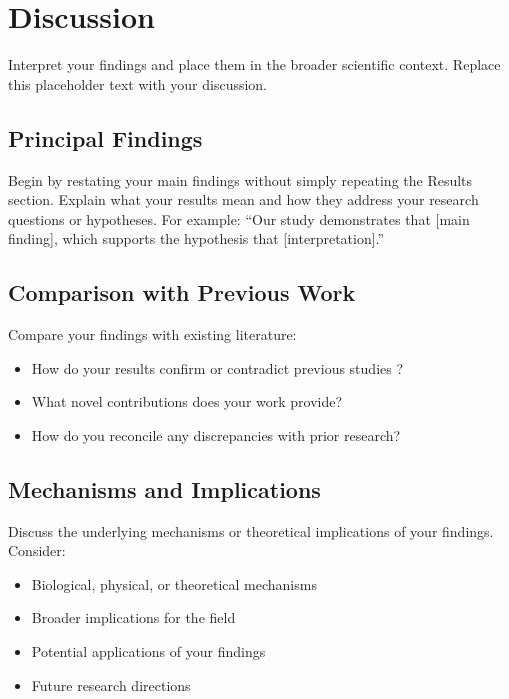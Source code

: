 
\section{Discussion}

Interpret your findings and place them in the broader scientific context. Replace this placeholder text with your discussion.

\subsection{Principal Findings}

Begin by restating your main findings without simply repeating the Results section. Explain what your results mean and how they address your research questions or hypotheses. For example: ``Our study demonstrates that [main finding], which supports the hypothesis that [interpretation].''

\subsection{Comparison with Previous Work}

Compare your findings with existing literature:
\begin{itemize}
    \item How do your results confirm or contradict previous studies \cite{example_study_2021}?
    \item What novel contributions does your work provide?
    \item How do you reconcile any discrepancies with prior research?
\end{itemize}

\subsection{Mechanisms and Implications}

Discuss the underlying mechanisms or theoretical implications of your findings. Consider:
\begin{itemize}
    \item Biological, physical, or theoretical mechanisms
    \item Broader implications for the field
    \item Potential applications of your findings
    \item Future research directions
\end{itemize}

